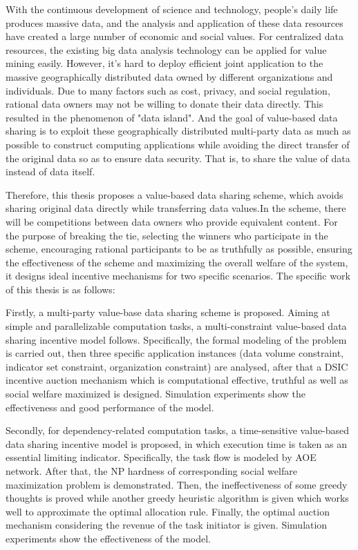 \documentclass[promaster]{thesis-uestc}
\begin{document}
\begin{englishabstract}
With the continuous development of science and technology, people's daily life produces massive data, and the analysis and application of these data resources have created a large number of economic and social values. For centralized data resources, the existing big data analysis technology can be applied for value mining easily. However, it's hard to deploy efficient joint application to the massive geographically distributed data owned by different organizations and individuals. Due to many factors such as cost, privacy, and social regulation, rational data owners may not be willing to donate their data directly. This resulted in the phenomenon of "data island". And the goal of value-based data sharing is to exploit these geographically distributed multi-party data as much as possible to construct computing applications while avoiding the direct transfer of the original data so as to ensure data security. That is, to share the value of data instead of data itself.

Therefore, this thesis proposes a value-based data sharing scheme, which avoids sharing original data directly while transferring data values.In the scheme, there will be competitions between data owners who provide equivalent content. For the purpose of breaking the tie, selecting the winners who participate in the scheme, encouraging rational participants to be as truthfully as possible, ensuring the effectiveness of the scheme and maximizing the overall welfare of the system, it designs ideal incentive mechanisms for two specific scenarios. The specific work of this thesis is as follows:

Firstly, a multi-party value-base data sharing scheme is proposed. Aiming at simple and parallelizable computation tasks, a multi-constraint value-based data sharing incentive model follows. Specifically, the formal modeling of the problem is carried out, then three specific application instances (data volume constraint, indicator set constraint, organization constraint) are analysed, after that a DSIC incentive auction mechanism which is computational effective, truthful as well as social welfare maximized is designed. Simulation experiments show the effectiveness and good performance of the model.

Secondly, for dependency-related computation tasks, a time-sensitive value-based data sharing incentive model is proposed, in which execution time is taken as an essential limiting indicator. Specifically, the task flow is modeled by AOE network. After that, the NP hardness of corresponding social welfare maximization problem is demonstrated. Then, the ineffectiveness of some greedy thoughts is proved while another greedy heuristic algorithm is given which works well to approximate the optimal allocation rule. Finally, the optimal auction mechanism considering the revenue of the task initiator is given. Simulation experiments show the effectiveness of the model.


\end{englishabstract}
\end{document}

